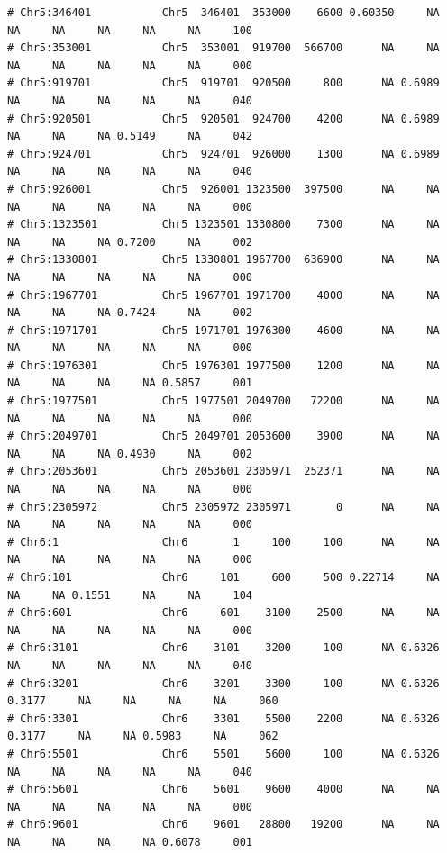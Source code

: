 \documentclass{article}\usepackage[]{graphicx}\usepackage[]{color}
\makeatletter
\newenvironment{kframe}{%
 \def\at@end@of@kframe{}%
 \ifinner\ifhmode%
  \def\at@end@of@kframe{\end{minipage}}%
  \begin{minipage}{\columnwidth}%
 \fi\fi%
 \def\FrameCommand##1{\hskip\@totalleftmargin \hskip-\fboxsep
 \colorbox{shadecolor}{##1}\hskip-\fboxsep
     \hskip-\linewidth \hskip-\@totalleftmargin \hskip\columnwidth}%
 \MakeFramed {\advance\hsize-\width
   \@totalleftmargin\z@ \linewidth\hsize
   \@setminipage}}%
 {\par\unskip\endMakeFramed%
 \at@end@of@kframe}
\newenvironment{knitrout}{}{} %
\makeatother
\begin{document}
\begin{knitrout}
\begin{kframe}
\begin{verbatim}
# Chr5:346401           Chr5  346401  353000    6600 0.60350     NA     NA     NA     NA     NA     NA     100
# Chr5:353001           Chr5  353001  919700  566700      NA     NA     NA     NA     NA     NA     NA     000
# Chr5:919701           Chr5  919701  920500     800      NA 0.6989     NA     NA     NA     NA     NA     040
# Chr5:920501           Chr5  920501  924700    4200      NA 0.6989     NA     NA     NA 0.5149     NA     042
# Chr5:924701           Chr5  924701  926000    1300      NA 0.6989     NA     NA     NA     NA     NA     040
# Chr5:926001           Chr5  926001 1323500  397500      NA     NA     NA     NA     NA     NA     NA     000
# Chr5:1323501          Chr5 1323501 1330800    7300      NA     NA     NA     NA     NA 0.7200     NA     002
# Chr5:1330801          Chr5 1330801 1967700  636900      NA     NA     NA     NA     NA     NA     NA     000
# Chr5:1967701          Chr5 1967701 1971700    4000      NA     NA     NA     NA     NA 0.7424     NA     002
# Chr5:1971701          Chr5 1971701 1976300    4600      NA     NA     NA     NA     NA     NA     NA     000
# Chr5:1976301          Chr5 1976301 1977500    1200      NA     NA     NA     NA     NA     NA 0.5857     001
# Chr5:1977501          Chr5 1977501 2049700   72200      NA     NA     NA     NA     NA     NA     NA     000
# Chr5:2049701          Chr5 2049701 2053600    3900      NA     NA     NA     NA     NA 0.4930     NA     002
# Chr5:2053601          Chr5 2053601 2305971  252371      NA     NA     NA     NA     NA     NA     NA     000
# Chr5:2305972          Chr5 2305972 2305971       0      NA     NA     NA     NA     NA     NA     NA     000
# Chr6:1                Chr6       1     100     100      NA     NA     NA     NA     NA     NA     NA     000
# Chr6:101              Chr6     101     600     500 0.22714     NA     NA     NA 0.1551     NA     NA     104
# Chr6:601              Chr6     601    3100    2500      NA     NA     NA     NA     NA     NA     NA     000
# Chr6:3101             Chr6    3101    3200     100      NA 0.6326     NA     NA     NA     NA     NA     040
# Chr6:3201             Chr6    3201    3300     100      NA 0.6326 0.3177     NA     NA     NA     NA     060
# Chr6:3301             Chr6    3301    5500    2200      NA 0.6326 0.3177     NA     NA 0.5983     NA     062
# Chr6:5501             Chr6    5501    5600     100      NA 0.6326     NA     NA     NA     NA     NA     040
# Chr6:5601             Chr6    5601    9600    4000      NA     NA     NA     NA     NA     NA     NA     000
# Chr6:9601             Chr6    9601   28800   19200      NA     NA     NA     NA     NA     NA 0.6078     001

\end{verbatim}
\end{kframe}
\end{knitrout}
\end{document}
